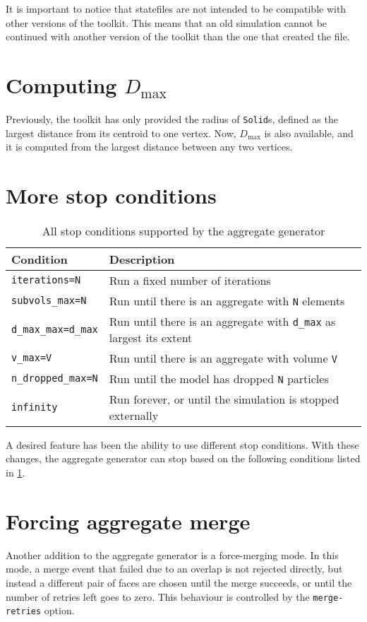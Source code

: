 \documentclass[a4paper,10pt]{scrartcl}
\begin{document}
It is important to notice that statefiles are not intended to be compatible with other versions of the toolkit. This means that an old simulation cannot be continued with another version of the toolkit than the one that created the file.

\section{Computing $D_\text{max}$}
Previously, the toolkit has only provided the radius of \texttt{Solid}s, defined as the largest distance from its centroid to one vertex. Now, $D_\text{max}$ is also available, and it is computed from the largest distance between any two vertices. 

\section{More stop conditions}
\begin{table}
 \caption{\label{stopcond}All stop conditions supported by the aggregate generator}
 \begin{tabular}{p{}p{}}
 \hline
 \hline
  \textbf{Condition} & \textbf{Description}\\
  \hline
  \texttt{iterations=N} &  Run a fixed number of iterations \\
  \texttt{subvols\_max=N}              &  Run until there is an aggregate with \texttt{N} elements \\
  \texttt{d\_max\_max=d\_max}            &  Run until there is an aggregate with \texttt{d\_max} as largest its extent \\
  \texttt{v\_max=V}                     & Run until there is an aggregate with volume \texttt{V} \\
  \texttt{n\_dropped\_max=N}           & Run until the model has dropped \texttt{N} particles \\
  \texttt{infinity}                    & Run forever, or until the simulation is stopped externally \\
  \hline
  \hline
 \end{tabular}
\end{table}

A desired feature has been the ability to use different stop conditions. With these changes, the aggregate generator can stop based on the following conditions listed in \cref{stopcond}.

\section{Forcing aggregate merge}
Another addition to the aggregate generator is a force-merging mode. In this mode, a merge event that failed due to an overlap is not rejected directly, but instead a different pair of faces are chosen until the merge succeeds, or until the number of retries left goes to zero. This behaviour is controlled by the \texttt{merge-retries} option.
\end{document}
